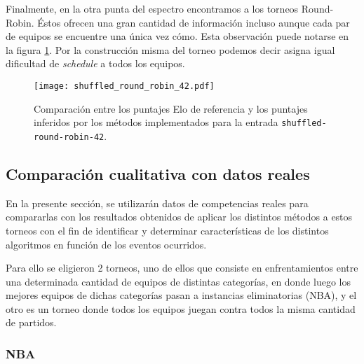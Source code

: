 \documentclass[a4paper]{article}
\begin{document}
Finalmente, en la otra punta del espectro encontramos a los torneos Round-Robin. Éstos ofrecen una gran cantidad de información incluso aunque cada par de equipos se encuentre una única vez cómo. Esta observación puede notarse en la figura \ref{fig:shuffledrr42}. Por la construcción misma del torneo podemos decir asigna igual dificultad de \textit{schedule} a todos los equipos.

\begin{figure}
    \centering
    \texttt{[image: shuffled\_round\_robin\_42.pdf]}
    \caption{Comparación entre los puntajes Elo de referencia y los puntajes inferidos por los métodos implementados para la entrada \texttt{shuffled-round-robin-42}.}
    \label{fig:shuffledrr42}
\end{figure}

\clearpage

\subsection{Comparación cualitativa con datos reales}

En la presente sección, se utilizarán datos de competencias reales para compararlas con los resultados obtenidos de aplicar los distintos métodos a estos torneos con el fin de identificar y determinar características de los distintos algoritmos en función de los eventos ocurridos.

Para ello se eligieron 2 torneos, uno de ellos que consiste en enfrentamientos entre una determinada cantidad de equipos de distintas categorías, en donde luego los mejores equipos de dichas categorías pasan a instancias eliminatorias (NBA), y el otro es un torneo donde todos los equipos juegan contra todos la misma cantidad de partidos.

\subsubsection{NBA}
\end{document}
